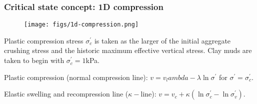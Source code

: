 \documentclass[notes]{beamer}
\begin{document}
\begin{frame}
\frametitle{Critical state concept: 1D compression}
\begin{figure}
	\texttt{[image: figs/1d-compression.png]}
\end{figure}
Plastic compression stress $\sigma_c^\prime$ is taken as the larger of the initial aggregate crushing stress and the historic maximum effective vertical stress. Clay muds are taken to begin with $\sigma_c^\prime = 1$kPa.

Plastic compression (normal compression line): $v = v_lambda - \lambda \ln \sigma^\prime$ for $\sigma^\prime = \sigma^\prime_c$.

Elastic swelling and recompression line ($\kappa-$line): $ v = v_c + \kappa (\ln \sigma_c^\prime - \ln \sigma_v^\prime)$. 
\end{frame}
\end{document}

